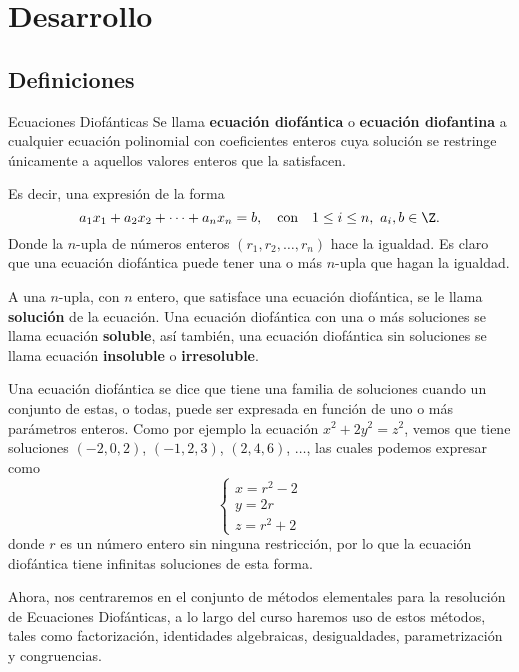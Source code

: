 \section{Desarrollo}

\subsection{Definiciones}

\begin{definition.tcb}{Ecuaciones Diofánticas}{}
    Se llama \textbf{ecuación diofántica} o \textbf{ecuación diofantina} a cualquier ecuación polinomial con coeficientes enteros cuya
    solución se restringe únicamente a aquellos valores enteros que la satisfacen.
\end{definition.tcb}

Es decir, una expresión de la forma
\[
    a_1 x_1 + a_2 x_2 + \cdots + a_n x_n = b, \quad \text{con} \quad 1 \leq i \leq n,\ a_i, b \in \Z.
\]
Donde la $n$-upla de números enteros $(r_1, r_2, \ldots, r_n)$ hace la igualdad.
Es claro que una ecuación diofántica puede tener una o más $n$-upla que hagan la igualdad.

\begin{definition.tcb}{}{}
    A una $n$-upla, con $n$ entero, que satisface una ecuación diofántica, se le llama \textbf{solución} de la ecuación.
    Una ecuación diofántica con una o más soluciones se llama ecuación \textbf{soluble}, así también, una ecuación diofántica sin
    soluciones se llama ecuación \textbf{insoluble} o \textbf{irresoluble}.
\end{definition.tcb}

Una ecuación diofántica se dice que tiene una familia de soluciones cuando un conjunto de estas, o todas, puede ser expresada en función de uno o más parámetros enteros.
Como por ejemplo la ecuación $x^2 + 2y^2 = z^2$, vemos que tiene soluciones $(-2, 0, 2)$, $(-1, 2, 3)$, $(2, 4, 6)$, $\ldots$, las cuales podemos expresar como
\[
    \begin{cases}
        x = r^2 - 2\\
        y = 2r\\
        z = r^2 + 2
    \end{cases}
\]
donde $r$ es un número entero sin ninguna restricción, por lo que la ecuación diofántica tiene infinitas soluciones de esta forma.

Ahora, nos centraremos en el conjunto de métodos elementales para la resolución de Ecuaciones Diofánticas, a lo largo del curso
haremos uso de estos métodos, tales como factorización, identidades algebraicas, desigualdades, parametrización y congruencias.

